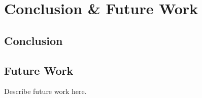 \chapter{Conclusion \& Future Work}\label{ch:conclusion-future-work}

\section{Conclusion}\label{sec:conclusion}

\section{Future Work}\label{sec:future-work}
Describe future work here.